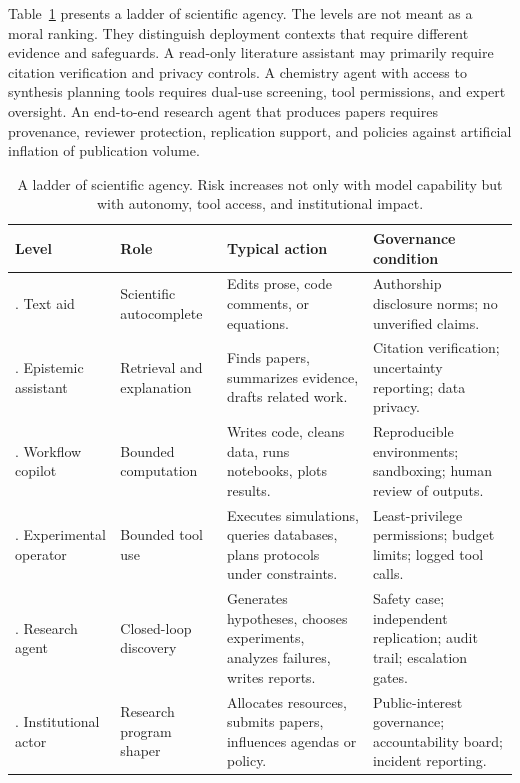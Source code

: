 \documentclass{article}
\begin{document}
Table~\ref{tab:ladder} presents a ladder of scientific agency. The levels are not meant as a moral ranking. They distinguish deployment contexts that require different evidence and safeguards. A read-only literature assistant may primarily require citation verification and privacy controls. A chemistry agent with access to synthesis planning tools requires dual-use screening, tool permissions, and expert oversight. An end-to-end research agent that produces papers requires provenance, reviewer protection, replication support, and policies against artificial inflation of publication volume.

\begin{table}[t]
\centering
\small
\setlength{\tabcolsep}{4pt}
\renewcommand{\arraystretch}{1.3}
\caption{A ladder of scientific agency. Risk increases not only with model capability but with autonomy, tool access, and institutional impact.}
\label{tab:ladder}
\begin{tabularx}{\textwidth}{@{}>{\raggedright\arraybackslash}p{}>{\raggedright\arraybackslash}p{}>{\raggedright\arraybackslash}p{}>{\raggedright\arraybackslash}X@{}}
\toprule
Level & Role & Typical action & Governance condition \\
\midrule
0. Text aid & Scientific autocomplete & Edits prose, code comments, or equations. & Authorship disclosure norms; no unverified claims. \\
1. Epistemic assistant & Retrieval and explanation & Finds papers, summarizes evidence, drafts related work. & Citation verification; uncertainty reporting; data privacy. \\
2. Workflow copilot & Bounded computation & Writes code, cleans data, runs notebooks, plots results. & Reproducible environments; sandboxing; human review of outputs. \\
3. Experimental operator & Bounded tool use & Executes simulations, queries databases, plans protocols under constraints. & Least-privilege permissions; budget limits; logged tool calls. \\
4. Research agent & Closed-loop discovery & Generates hypotheses, chooses experiments, analyzes failures, writes reports. & Safety case; independent replication; audit trail; escalation gates. \\
5. Institutional actor & Research program shaper & Allocates resources, submits papers, influences agendas or policy. & Public-interest governance; accountability board; incident reporting. \\
\bottomrule
\end{tabularx}
\end{table}
\end{document}
